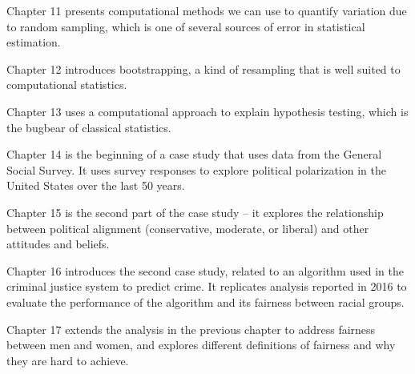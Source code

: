 \begin{description}
\item Chapter 11 presents computational methods we can use to quantify variation due to random sampling, which is one of several sources of error in statistical estimation.

\item Chapter 12 introduces bootstrapping, a kind of resampling that is
well suited to computational statistics.

\item Chapter 13 uses a computational approach to explain hypothesis testing, which is the bugbear of classical statistics.

\item Chapter 14 is the beginning of a case study that uses data from the General Social Survey. It uses survey responses to explore political polarization in the United States over the last 50 years.

\item Chapter 15 is the second part of the case study -- it explores the relationship between political alignment (conservative, moderate, or liberal) and other attitudes and beliefs.

\item Chapter 16 introduces the second case study, related to an algorithm used in the criminal justice system to predict crime. It replicates analysis reported in 2016 to evaluate the performance of the algorithm and its fairness between racial groups.

\item Chapter 17 extends the analysis in the previous chapter to address fairness between men and women, and explores different definitions of fairness and why they are hard to achieve.

\end{description}

